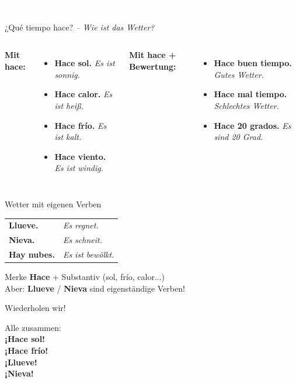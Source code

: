 \documentclass[aspectratio=169,11pt]{beamer}
\newcommand{\es}[1]{\textcolor{spanisch}{\textbf{#1}}}
\newcommand{\de}[1]{\textcolor{dunkelgrau}{\textit{#1}}}
\newcommand{\phase}[1]{\begin{center}\colorbox{spanisch}{\textcolor{white}{\large\bfseries #1}}\end{center}}
\begin{document}
\begin{frame}{}
\phase{Input: El tiempo}
\end{frame}

\begin{frame}{¿Qué tiempo hace? \de{– Wie ist das Wetter?}}
\begin{columns}
\textbf{Mit \es{hace}:}
\begin{itemize}
\item \es{Hace sol.} \de{Es ist sonnig.}
\item \es{Hace calor.} \de{Es ist heiß.}
\item \es{Hace frío.} \de{Es ist kalt.}
\item \es{Hace viento.} \de{Es ist windig.}
\end{itemize}

\textbf{Mit \es{hace} + Bewertung:}
\begin{itemize}
\item \es{Hace buen tiempo.} \de{Gutes Wetter.}
\item \es{Hace mal tiempo.} \de{Schlechtes Wetter.}
\item \es{Hace 20 grados.} \de{Es sind 20 Grad.}
\end{itemize}
\end{columns}
\end{frame}

\begin{frame}{Wetter mit eigenen Verben}
\begin{center}
\begin{tabular}{ll}
\es{Llueve.} & \de{Es regnet.} \\[0.8em]
\es{Nieva.} & \de{Es schneit.} \\[0.8em]
\es{Hay nubes.} & \de{Es ist bewölkt.} \\
\end{tabular}
\end{center}

\vspace{1cm}

\begin{block}{Merke}
\es{Hace} + Substantiv (sol, frío, calor...)\\
Aber: \es{Llueve} / \es{Nieva} sind eigenständige Verben!
\end{block}
\end{frame}

\begin{frame}{Wiederholen wir!}
\begin{center}
{\Large Alle zusammen:}\\[1cm]
\pause
{\Huge \es{¡Hace sol!}}\\[0.5cm]
\pause
{\Huge \es{¡Hace frío!}}\\[0.5cm]
\pause
{\Huge \es{¡Llueve!}}\\[0.5cm]
\pause
{\Huge \es{¡Nieva!}}
\end{center}
\end{frame}
\end{document}
